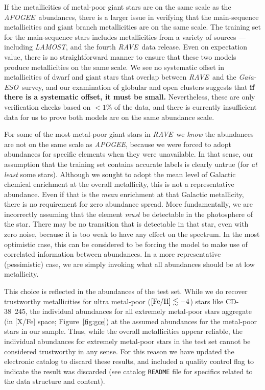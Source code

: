 \documentclass[preprint,trackchanges]{aastex}
\newcommand{\acronym}[1]{{\small{#1}}}
\newcommand{\project}[1]{\textsl{#1}}
\newcommand{\rave}{\project{\acronym{RAVE}}}
\newcommand{\ges}{\project{Gaia-ESO}}
\newcommand{\apogee}{\project{\acronym{APOGEE}}}
\newcommand{\lamost}{\project{\acronym{LAMOST}}}
\newcommand{\stub}[1]{{\color{blue} \textbf{#1}}}
\begin{document}
If the metallicities of metal-poor giant stars are on the same scale as the \apogee\
abundances, there is a larger issue in verifying that the main-sequence metallicities
and giant branch metallicities are on the same scale.  The training set for the
main-sequence stars includes metallicities from a variety of sources --- including
\lamost, and the fourth \rave\ data release.  Even on expectation value, there is 
no straightforward manner to ensure that these two models produce metallicities on
the same scale.  We see no systematic offset in metallicities of dwarf and giant
stars that overlap between \rave\ and the \ges\ survey, and our examination of
globular and open clusters suggests that \stub{if there is a systematic offset, it must
be small.} Nevertheless, these are only verification checks based on $<1$\% of the
data, and there is currently insufficient data for us to prove both models are on
the same abundance scale.


For some of the most metal-poor giant stars in \rave\, we \emph{know} the abundances 
are not on the same scale as \apogee, because we were forced to adopt abundances for 
specific elements when they were unavailable.  In that sense, our assumption that the
training set contains accurate labels is clearly untrue (for \emph{at least} some stars).
Although we sought to adopt the mean
level of Galactic chemical enrichment at the overall metallicity, this is not a
representative abundance. Even if that is the \emph{mean} enrichment at that Galactic
metallicity, there is no requirement for zero abundance spread.
More fundamentally, we are incorrectly assuming that the element \emph{must} be 
detectable in the photosphere of the star.  There may be no transition that is 
detectable in that star, even with zero noise, because it is too weak to have any 
effect on the spectrum.  In the most optimistic case, this can be considered to be
forcing the model to make use of correlated information between abundances.  In a
more representative (pessimistic) case, we are simply invoking what all abundances
should be at low metallicity.


This choice is reflected in the abundances of the test set.  While we do recover
trustworthy metallicities for ultra metal-poor ($[{\rm Fe/H}] \lesssim -4$) stars like 
CD-38~245, the individual abundances for all extremely metal-poor stars aggregate
(in [X/Fe] space; Figure~\ref{fig:gce}) at the assumed abundances for the metal-poor
stars in our sample.  Thus, while the overall metallicities appear reliable, the 
individual abundances for extremely metal-poor stars in the test set cannot be
considered trustworthy in any sense.  For this reason we have updated the electronic
catalog to discard these results, and included a quality control flag to indicate
the result was discarded (see catalog \texttt{README} file for specifics related to
the data structure and content).
\end{document}
